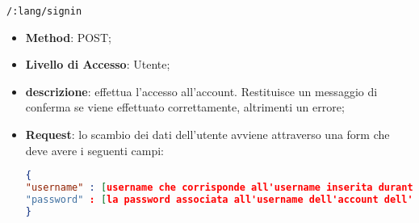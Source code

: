 	\item \texttt{/:lang/signin}
		\begin{itemize}
			\item \textbf{Method}: POST;
			\item \textbf{Livello di Accesso}: Utente;
			\item \textbf{descrizione}: effettua l'accesso all'account. Restituisce un messaggio di conferma se viene effettuato correttamente, altrimenti un errore;
			\item \textbf{Request}: lo scambio dei dati dell'utente avviene attraverso una form che deve avere i seguenti campi:
\begin{lstlisting}[language=json,firstnumber=1]
{
"username" : [username che corrisponde all'username inserita durante la registrazione]
"password" : [la password associata all'username dell'account dell'utente]
}
\end{lstlisting}
		\end{itemize}